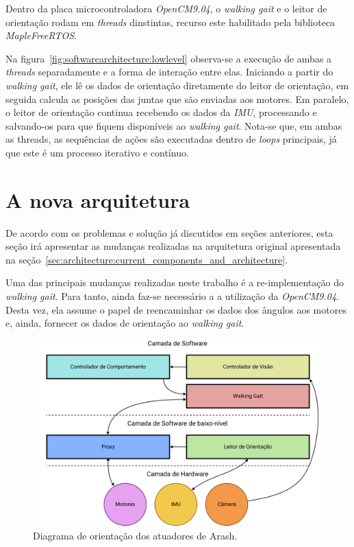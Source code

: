 Dentro da placa microcontroladora \textit{OpenCM9.04}, o \textit{walking gait} e o leitor de orientação rodam em \textit{threads} dinstintas, recurso este habilitado pela biblioteca \textit{MapleFreeRTOS}.

Na figura~\ref{fig:softwarearchitecture:lowlevel} observa-se a execução de ambas a \textit{threads} separadamente e a forma de interação entre elas. Iniciando a partir do \textit{walking gait}, ele lê os dados de orientação diretamente do leitor de orientação, em seguida calcula as posições das juntas que são enviadas aos motores. Em paralelo, o leitor de orientação continua recebendo os dados da \textit{IMU}, processando e salvando-os para que fiquem disponíveis ao \textit{walking gait}. Nota-se que, em ambas as threads, as sequências de ações são executadas dentro de \textit{loops} principais, já que este é um processo iterativo e contínuo.

\section{A nova arquitetura}

De acordo com os problemas e solução já discutidos em seções anteriores, esta seção irá apresentar as mudanças realizadas na arquitetura original apresentada na seção~\ref{sec:architecture:current_components_and_architecture}.

Uma das principais mudanças realizadas neste trabalho é a re-implementação do \textit{walking gait}. Para tanto, ainda faz-se necessário a a utilização da \textit{OpenCM9.04}. Desta vez, ela assume o papel de reencaminhar os dados dos ângulos aos motores e, ainda, fornecer os dados de orientação ao \textit{walking gait}.

\begin{figure}[h!]
	\centering
	\includegraphics[scale=1]{imagens/svg/softwarearchitecture-newproposal}
	\caption{Diagrama de orientação dos atuadores de Arash.}
	\label{fig:softwarearchitecture:newproposal}
\end{figure}


